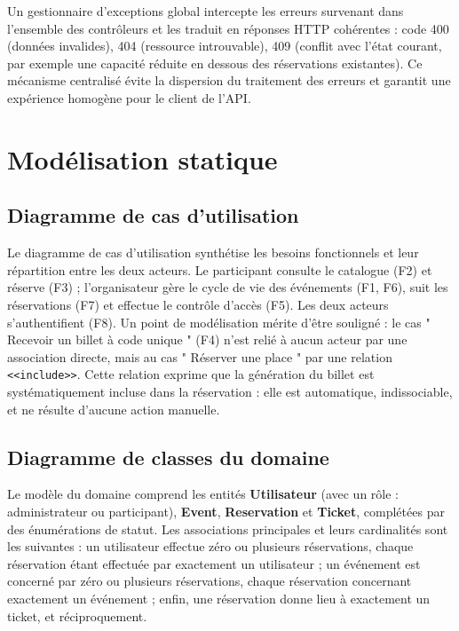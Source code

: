 \documentclass[12pt,a4paper]{report}
\newcommand{\code}[1]{\textcolor{codecolor}{\texttt{#1}}}
\begin{document}
Un gestionnaire d'exceptions global intercepte les erreurs survenant dans l'ensemble des contrôleurs et les traduit en réponses HTTP cohérentes : code 400 (données invalides), 404 (ressource introuvable), 409 (conflit avec l'état courant, par exemple une capacité réduite en dessous des réservations existantes). Ce mécanisme centralisé évite la dispersion du traitement des erreurs et garantit une expérience homogène pour le client de l'API.

\section{Modélisation statique}

\subsection{Diagramme de cas d'utilisation}

\begin{center}\end{center}

Le diagramme de cas d'utilisation synthétise les besoins fonctionnels et leur répartition entre les deux acteurs. Le participant consulte le catalogue (F2) et réserve (F3) ; l'organisateur gère le cycle de vie des événements (F1, F6), suit les réservations (F7) et effectue le contrôle d'accès (F5). Les deux acteurs s'authentifient (F8). Un point de modélisation mérite d'être souligné : le cas " Recevoir un billet à code unique " (F4) n'est relié à aucun acteur par une association directe, mais au cas " Réserver une place " par une relation \code{<<include>>}. Cette relation exprime que la génération du billet est systématiquement incluse dans la réservation : elle est automatique, indissociable, et ne résulte d'aucune action manuelle.

\subsection{Diagramme de classes du domaine}

\begin{center}\end{center}

Le modèle du domaine comprend les entités \textbf{Utilisateur} (avec un rôle : administrateur ou participant), \textbf{Event}, \textbf{Reservation} et \textbf{Ticket}, complétées par des énumérations de statut. Les associations principales et leurs cardinalités sont les suivantes : un utilisateur effectue zéro ou plusieurs réservations, chaque réservation étant effectuée par exactement un utilisateur ; un événement est concerné par zéro ou plusieurs réservations, chaque réservation concernant exactement un événement ; enfin, une réservation donne lieu à exactement un ticket, et réciproquement.
\end{document}
